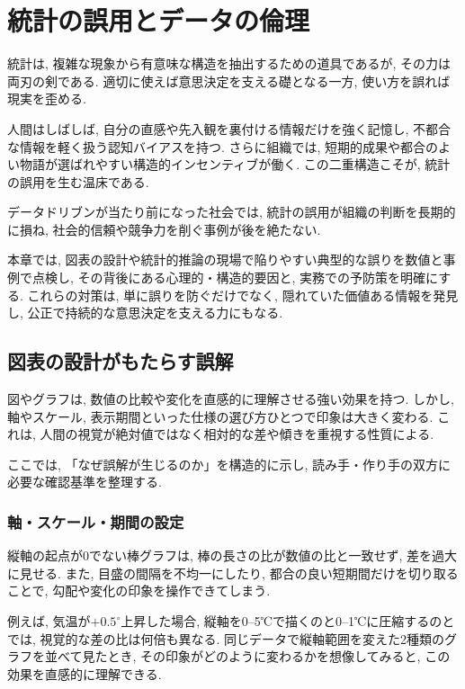 \section{統計の誤用とデータの倫理}

統計は, 複雑な現象から有意味な構造を抽出するための道具であるが, その力は両刃の剣である.  
適切に使えば意思決定を支える礎となる一方, 使い方を誤れば現実を歪める.  

人間はしばしば, 自分の直感や先入観を裏付ける情報だけを強く記憶し, 不都合な情報を軽く扱う認知バイアスを持つ.  
さらに組織では, 短期的成果や都合のよい物語が選ばれやすい構造的インセンティブが働く.  
この二重構造こそが, 統計の誤用を生む温床である.

データドリブンが当たり前になった社会では, 統計の誤用が組織の判断を長期的に損ね, 社会的信頼や競争力を削ぐ事例が後を絶たない.  

本章では, 図表の設計や統計的推論の現場で陥りやすい典型的な誤りを数値と事例で点検し, その背後にある心理的・構造的要因と, 実務での予防策を明確にする.  
これらの対策は, 単に誤りを防ぐだけでなく, 隠れていた価値ある情報を発見し, 公正で持続的な意思決定を支える力にもなる.

\subsection{図表の設計がもたらす誤解}

図やグラフは, 数値の比較や変化を直感的に理解させる強い効果を持つ.  
しかし, 軸やスケール, 表示期間といった仕様の選び方ひとつで印象は大きく変わる.  
これは, 人間の視覚が絶対値ではなく相対的な差や傾きを重視する性質による.

ここでは, 「なぜ誤解が生じるのか」を構造的に示し, 読み手・作り手の双方に必要な確認基準を整理する.

\subsubsection{軸・スケール・期間の設定}

縦軸の起点が0でない棒グラフは, 棒の長さの比が数値の比と一致せず, 差を過大に見せる.  
また, 目盛の間隔を不均一にしたり, 都合の良い短期間だけを切り取ることで, 勾配や変化の印象を操作できてしまう.  

例えば, 気温が$+0.5^\circ$上昇した場合, 縦軸を0--5℃で描くのと0--1℃に圧縮するのとでは, 視覚的な差の比は何倍も異なる.  
同じデータで縦軸範囲を変えた2種類のグラフを並べて見たとき, その印象がどのように変わるかを想像してみると, この効果を直感的に理解できる.

